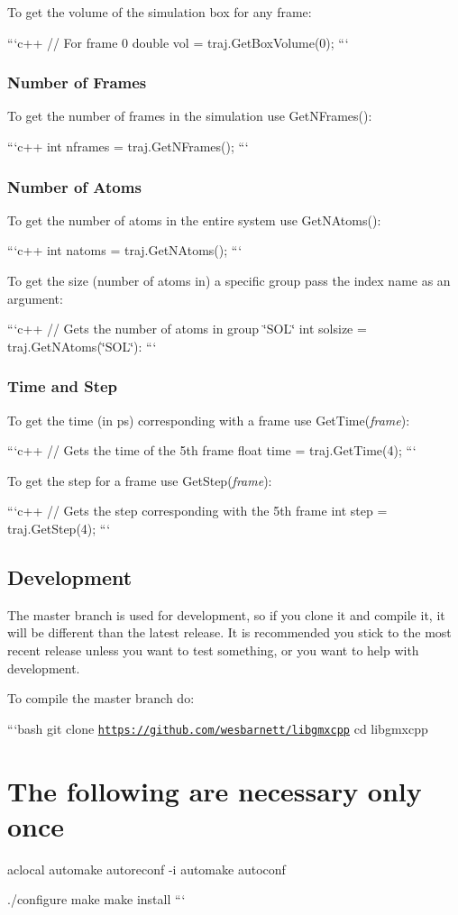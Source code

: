 To get the volume of the simulation box for any frame\-:

```c++ // For frame 0 double vol = traj.\-Get\-Box\-Volume(0); ```

\subsubsection*{Number of Frames}

To get the number of frames in the simulation use Get\-N\-Frames()\-:

```c++ int nframes = traj.\-Get\-N\-Frames(); ```

\subsubsection*{Number of Atoms}

To get the number of atoms in the entire system use Get\-N\-Atoms()\-:

```c++ int natoms = traj.\-Get\-N\-Atoms(); ```

To get the size (number of atoms in) a specific group pass the index name as an argument\-:

```c++ // Gets the number of atoms in group \char`\"{}\-S\-O\-L\char`\"{} int solsize = traj.\-Get\-N\-Atoms(\char`\"{}\-S\-O\-L\char`\"{})\-: ```

\subsubsection*{Time and Step}

To get the time (in ps) corresponding with a frame use Get\-Time({\itshape frame})\-:

```c++ // Gets the time of the 5th frame float time = traj.\-Get\-Time(4); ```

To get the step for a frame use Get\-Step({\itshape frame})\-:

```c++ // Gets the step corresponding with the 5th frame int step = traj.\-Get\-Step(4); ```

\subsection*{Development}

The master branch is used for development, so if you clone it and compile it, it will be different than the latest release. It is recommended you stick to the most recent release unless you want to test something, or you want to help with development.

To compile the master branch do\-:

```bash git clone \href{https://github.com/wesbarnett/libgmxcpp}{\tt https\-://github.\-com/wesbarnett/libgmxcpp} cd libgmxcpp

\section*{The following are necessary only once}

aclocal automake autoreconf -\/i automake autoconf

./configure make make install ``` 